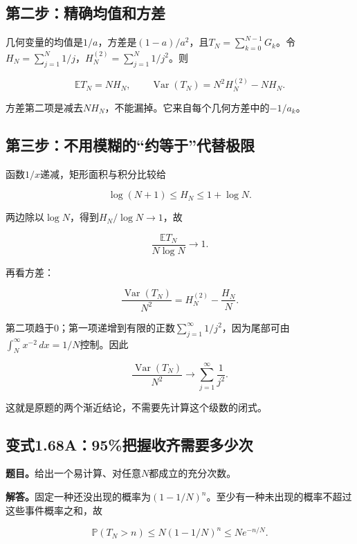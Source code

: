 \documentclass[
  11pt,a4paper,UTF8,fontset=fandol]{ctexart}
\begin{document}
\subsection{第二步：精确均值和方差}\label{ux7b2cux4e8cux6b65ux7cbeux786eux5747ux503cux548cux65b9ux5dee}

几何变量的均值是\(1/a\)，方差是\((1-a)/a^2\)，且\(T_N=\sum_{k=0}^{N-1}G_k\)。令\(H_N=\sum_{j=1}^N1/j\)，\(H_N^{(2)}=\sum_{j=1}^N1/j^2\)。则

\[\boxed{\mathbb ET_N=NH_N,\qquad\operatorname{Var}(T_N)=N^2H_N^{(2)}-NH_N.}\]

方差第二项是减去\(NH_N\)，不能漏掉。它来自每个几何方差中的\(-1/a_k\)。

\subsection{第三步：不用模糊的``约等于''代替极限}\label{ux7b2cux4e09ux6b65ux4e0dux7528ux6a21ux7ccaux7684ux7ea6ux7b49ux4e8eux4ee3ux66ffux6781ux9650}

函数\(1/x\)递减，矩形面积与积分比较给

\[\log(N+1)\le H_N\le1+\log N.\]

两边除以\(\log N\)，得到\(H_N/\log N\to1\)，故

\[\boxed{\frac{\mathbb ET_N}{N\log N}\longrightarrow1.}\]

再看方差：

\[\frac{\operatorname{Var}(T_N)}{N^2}=H_N^{(2)}-\frac{H_N}{N}.\]

第二项趋于0；第一项递增到有限的正数\(\sum_{j=1}^\infty1/j^2\)，因为尾部可由\(\int_N^\infty x^{-2}\,dx=1/N\)控制。因此

\[\boxed{\frac{\operatorname{Var}(T_N)}{N^2}\longrightarrow\sum_{j=1}^\infty\frac1{j^2}.}\]

这就是原题的两个渐近结论，不需要先计算这个级数的闭式。

\subsection{变式1.68A：95\%把握收齐需要多少次}\label{ux53d8ux5f0f1.68a95ux628aux63e1ux6536ux9f50ux9700ux8981ux591aux5c11ux6b21}

\textbf{题目。}给出一个易计算、对任意\(N\)都成立的充分次数。

\textbf{解答。}固定一种还没出现的概率为\((1-1/N)^n\)。至少有一种未出现的概率不超过这些事件概率之和，故

\[\mathbb P(T_N>n)\le N(1-1/N)^n\le Ne^{-n/N}.\]
\end{document}
